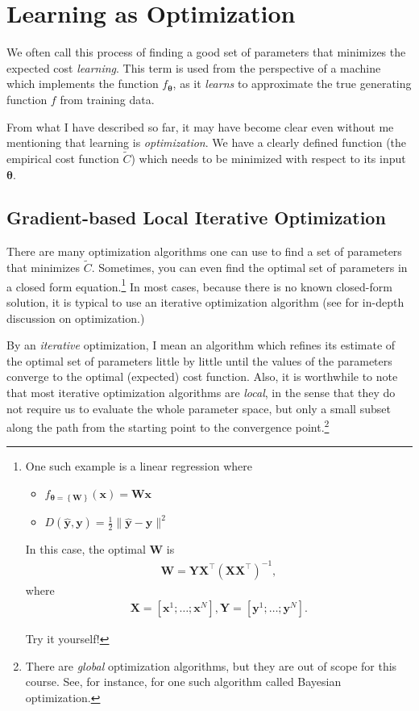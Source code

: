 \documentclass{report}
\newcommand{\vect}[1]{\mathbf{#1}}
\newcommand{\vects}[1]{\boldsymbol{#1}}
\newcommand{\matr}[1]{\mathbf{#1}}
\newcommand{\vx}[0]{\vect{x}}
\newcommand{\vy}[0]{\vect{y}}
\newcommand{\mW}[0]{\matr{W}}
\newcommand{\mX}[0]{\matr{X}}
\newcommand{\mY}[0]{\matr{Y}}
\newcommand{\TT}[0]{\vects{\theta}}
\begin{document}
\section{Learning as Optimization}

We often call this process of finding a good set of parameters that minimizes
the expected cost {\em learning}. This term is used from the perspective of a
machine which implements the function $f_{\TT}$, as it {\em learns} to
approximate the true generating function $f$ from training data.

From what I have described so far, it may have become clear even without me
mentioning that learning is {\em optimization}. We have a clearly defined
function (the empirical cost function $\tilde{C}$) which needs to be minimized
with respect to its input $\TT$.

\subsection{Gradient-based Local Iterative Optimization}
There are many optimization algorithms one can use to find a set of parameters
that minimizes $\tilde{C}$. Sometimes, you can even find the optimal set of
parameters in a closed form equation.\footnote{
    One such example is a linear regression where 
    \begin{itemize}
        \item $f_{\TT=\left\{ \mW\right\}}(\vx) = \mW \vx$
        \item $D(\hat{\vy}, \vy) = \frac{1}{2} \| \hat{\vy} - \vy \|^2$
    \end{itemize}
    In this case, the optimal $\mW$ is 
    \begin{align}
        \label{eq:opt_lin}
        \mW = \mY \mX^\top (\mX \mX^\top)^{-1},
    \end{align}
    where
    \begin{align*}
        \mX = \left[ \vx^1; \ldots ;\vx^N\right], \mY = \left[ \vy^1; \ldots ;\vy^N\right]. 
    \end{align*}

    Try it yourself! 
}
In most cases, because there is no known closed-form solution, it is typical to
use an iterative optimization algorithm (see \cite{Fletcher1987} for in-depth
discussion on optimization.) 

By an {\em iterative} optimization, I mean an algorithm which refines its
estimate of the optimal set of parameters little by little until the values of
the parameters converge to the optimal (expected) cost function. Also, it is
worthwhile to note that most iterative optimization algorithms are {\em local},
in the sense that they do not require us to evaluate the whole parameter space,
but only a small subset along the path from the starting point to the
convergence point.\footnote{
    There are {\em global} optimization algorithms, but they are out of scope
    for this course. See, for instance, \cite{Brochu2010} for one such algorithm
    called Bayesian optimization.
}
\end{document}
